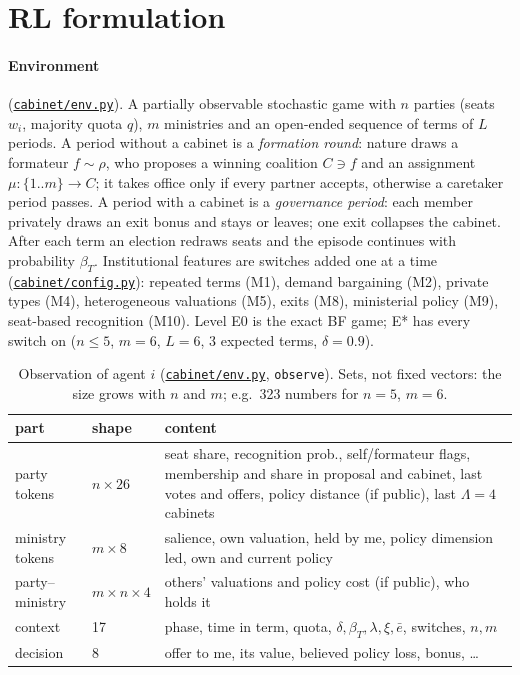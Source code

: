 \documentclass[10pt,twocolumn,a4paper]{article}
\newcommand{\repo}{https://github.com/bot2048/cabinet-bargaining-marl}
\newcommand{\code}[1]{\href{\repo/blob/main/#1}{\texttt{\footnotesize #1}}}
\begin{document}
\section{RL formulation}
\paragraph{Environment} (\code{cabinet/env.py}). A partially observable stochastic game with $n$ parties
(seats $w_i$, majority quota $q$), $m$ ministries and an open-ended sequence of terms of $L$ periods. A
period without a cabinet is a \emph{formation round}: nature draws a formateur $f\sim\rho$, who proposes a
winning coalition $C\ni f$ and an assignment $\mu:\{1..m\}\to C$; it takes office only if every partner
accepts, otherwise a caretaker period passes. A period with a cabinet is a \emph{governance period}: each
member privately draws an exit bonus and stays or leaves; one exit collapses the cabinet. After each term
an election redraws seats and the episode continues with probability $\beta_T$. Institutional features
are switches added one at a time (\code{cabinet/config.py}): repeated terms (M1), demand bargaining (M2),
private types (M4), heterogeneous valuations (M5), exits (M8), ministerial policy (M9), seat-based
recognition (M10). Level E0 is the exact BF game; E* has every switch on ($n\le5$, $m=6$, $L=6$, 3 expected
terms, $\delta=0.9$).

\begin{table}[t]\centering\scriptsize\setlength{\tabcolsep}{2.5pt}
\caption{Observation of agent $i$ (\code{cabinet/env.py}, \texttt{observe}). Sets, not fixed vectors:
the size grows with $n$ and $m$; e.g.\ 323 numbers for $n=5$, $m=6$.}\label{tab:state}
\begin{tabular}{@{}l l >{\raggedright\arraybackslash}p{4.85cm}@{}}\toprule
part & shape & content \\\midrule
party tokens & $n\times26$ & seat share, recognition prob., self/formateur flags, membership and share in
proposal and cabinet, last votes and offers, policy distance (if public), last $\Lambda=4$ cabinets\\
ministry tokens & $m\times8$ & salience, own valuation, held by me, policy dimension led, own and current
policy\\
party--ministry & $m\times n\times4$ & others' valuations and policy cost (if public), who holds it\\
context & 17 & phase, time in term, quota, $\delta,\beta_T,\lambda,\xi,\bar e$, switches, $n,m$\\
decision & 8 & offer to me, its value, believed policy loss, bonus, \dots\\\bottomrule
\end{tabular}\end{table}
\end{document}
